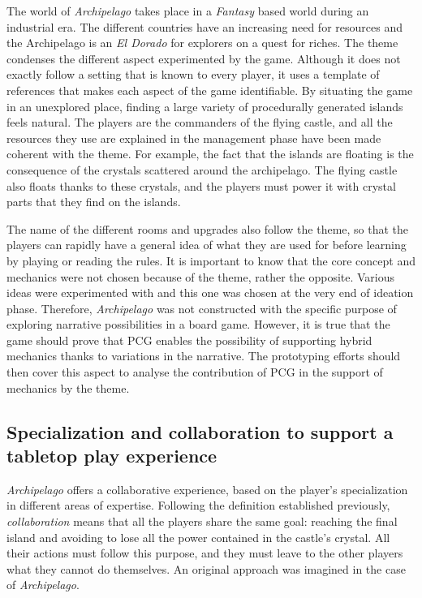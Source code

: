 The world of \textit{Archipelago} takes place in a \textit{Fantasy} based world during an industrial era. The different countries have an increasing need for resources and the Archipelago is an \textit{El Dorado} for explorers on a quest for riches. The theme condenses the different aspect experimented by the game. Although it does not exactly follow a setting that is known to every player, it uses a template of references that makes each aspect of the game identifiable. By situating the game in an unexplored place, finding a large variety of procedurally generated islands feels natural. The players are the commanders of the flying castle, and all the resources they use are explained in the management phase have been made coherent with the theme. For example, the fact that the islands are floating is the consequence of the crystals scattered around the archipelago. The flying castle also floats thanks to these crystals, and the players must power it with crystal parts that they find on the islands. 

The name of the different rooms and upgrades also follow the theme, so that the players can rapidly have a general idea of what they are used for before learning by playing or reading the rules. It is important to know that the core concept and mechanics were not chosen because of the theme, rather the opposite. Various ideas were experimented with and this one was chosen at the very end of ideation phase. Therefore, \textit{Archipelago} was not constructed with the specific purpose of exploring narrative possibilities in a board game. However, it is true that the game should prove that PCG enables the possibility of supporting hybrid mechanics thanks to variations in the narrative. The prototyping efforts should then cover this aspect to analyse the contribution of PCG in the support of mechanics by the theme.
\subsection{Specialization and collaboration to support a tabletop play experience}
\textit{Archipelago} offers a collaborative experience, based on the player's specialization in different areas of expertise. Following the definition established previously, \textit{collaboration} means that all the players share the same goal: reaching the final island and avoiding to lose all the power contained in the castle's crystal. All their actions must follow this purpose, and they must leave to the other players what they cannot do themselves. An original approach was imagined in the case of \textit{Archipelago}.

